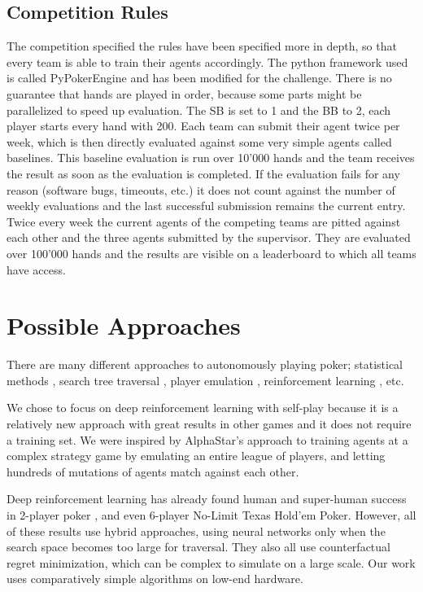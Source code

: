 \subsection{Competition Rules}
The competition specified the rules have been specified more in depth, so that every team is able to train their agents accordingly. The python framework used is called PyPokerEngine \cite{Pypokerengine} and has been modified for the challenge. There is no guarantee that hands are played in order, because some parts might be parallelized to speed up evaluation. The SB is set to 1 and the BB to 2, each player starts every hand with 200. Each team can submit their agent twice per week, which is then directly evaluated against some very simple agents called baselines. This baseline evaluation is run over 10'000 hands and the team receives the result as soon as the evaluation is completed. If the evaluation fails for any reason (software bugs, timeouts, etc.) it does not count against the number of weekly evaluations and the last successful submission remains the current entry. Twice every week the current agents of the competing teams are pitted against each other and the three agents submitted by the supervisor. They are evaluated over 100'000 hands and the results are visible on a leaderboard to which all teams have access.

\section{Possible Approaches}
There are many different approaches to autonomously playing poker; statistical methods \cite{PokerStatMethods1} \cite{PokerStatMethods2}, search tree traversal \cite{PokerTreeSearch} \cite{Deepstack}, player emulation \cite{PokerPlayerEmulation}, reinforcement learning \cite{Deepstack} \cite{Libratus} \cite{Pluribus} \cite{PokerReinforcementLearning}, etc.

We chose to focus on deep reinforcement learning with self-play because it is a relatively new approach with great results in other games \cite{GamesRL} \cite{OpenAIFive} \cite{Alphago} \cite{AlphaStar} and it does not require a training set. We were inspired by AlphaStar's \cite{AlphaStar} approach to training agents at a complex strategy game by emulating an entire league of players, and letting hundreds of mutations of agents match against each other.

Deep reinforcement learning has already found human and super-human success in 2-player poker \cite{Deepstack} \cite{Libratus}, and even 6-player No-Limit Texas Hold'em Poker\cite{Pluribus}. However, all of these results use hybrid approaches, using neural networks only when the search space becomes too large for traversal. They also all use counterfactual regret minimization, which can be complex to simulate on a large scale. Our work uses comparatively simple algorithms on low-end hardware.
